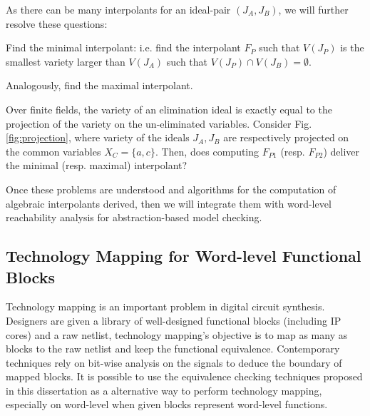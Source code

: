 \begin{Problem}
As there can be many interpolants for an ideal-pair $(J_A, J_B)$, we
will further resolve these questions:
\bi
\item Find the minimal interpolant: i.e. find the interpolant $F_P$
  such that $V(J_P)$ is the smallest variety larger than $V(J_A)$ such
  that $V(J_P) \cap V(J_B) = \emptyset$.
\item Analogously, find the maximal interpolant. 
\item Over finite fields, the variety of an elimination ideal is
  exactly equal to the projection of the variety on the un-eliminated
  variables. Consider Fig. \ref{fig:projection}, where variety of the
  ideals $J_A, J_B$ are respectively projected on the common variables
  $X_C = \{a, c\}$. Then, does computing $F_{P1}$ (resp. $F_{P2}$) 
  deliver the minimal (resp. maximal) interpolant?
\ei
\end{Problem}

\begin{figure}
\end{figure}


Once these problems are understood and algorithms for the computation
of algebraic interpolants derived, then we will integrate them 
with word-level reachability analysis for abstraction-based model
checking. 

\subsection{Technology Mapping for Word-level Functional Blocks}
Technology mapping is an important problem in digital circuit synthesis.
Designers are given a library of well-designed functional blocks (including IP cores) and a raw netlist, 
technology mapping's objective is to map as many as blocks to the raw netlist and 
keep the functional equivalence. Contemporary techniques rely on bit-wise 
analysis on the signals to deduce the boundary of mapped blocks.
It is possible to use the equivalence checking techniques proposed in this dissertation 
as a alternative way to perform technology mapping, especially on word-level when 
given blocks represent word-level functions.

